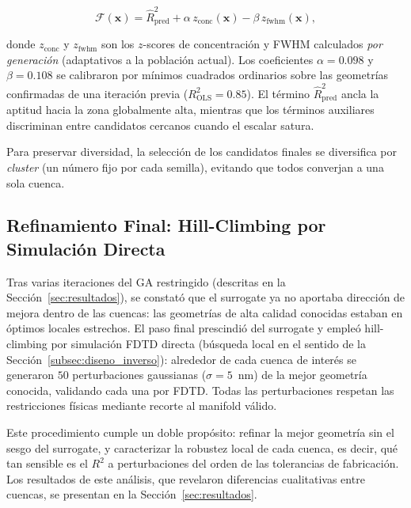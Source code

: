 \begin{equation}
    \mathcal{F}(\mathbf{x}) = \hat{R}^2_{\text{pred}}
    + \alpha\, z_{\text{conc}}(\mathbf{x}) - \beta\, z_{\text{fwhm}}(\mathbf{x}),
    \label{eq:combo_fitness}
\end{equation}

\noindent donde $z_{\text{conc}}$ y $z_{\text{fwhm}}$ son los $z$-scores de concentración y
FWHM calculados \emph{por generación} (adaptativos a la población actual). Los coeficientes
$\alpha = 0.098$ y $\beta = 0.108$ se calibraron por mínimos cuadrados ordinarios sobre las
geometrías confirmadas de una iteración previa ($R^2_{\text{OLS}} = 0.85$). El término
$\hat{R}^2_{\text{pred}}$ ancla la aptitud hacia la zona globalmente alta, mientras que los
términos auxiliares discriminan entre candidatos cercanos cuando el escalar satura.

Para preservar diversidad, la selección de los candidatos finales se diversifica por
\textit{cluster} (un número fijo por cada semilla), evitando que todos converjan a una
sola cuenca.

\subsection{Refinamiento Final: Hill-Climbing por Simulación Directa}\label{subsec:hill_climbing}

Tras varias iteraciones del GA restringido (descritas en la
Sección~\ref{sec:resultados}), se constató que el surrogate ya no aportaba dirección de mejora dentro de las cuencas: las geometrías de alta calidad conocidas estaban en óptimos locales estrechos. El paso final prescindió del surrogate y empleó hill-climbing por simulación FDTD directa (búsqueda local en el sentido de la Sección~\ref{subsec:diseno_inverso}): alrededor de cada cuenca de interés se generaron $50$ perturbaciones gaussianas ($\sigma = 5$~nm) de la mejor geometría conocida, validando cada una por FDTD. Todas las perturbaciones respetan las restricciones físicas mediante recorte al manifold válido.

Este procedimiento cumple un doble propósito: refinar la mejor geometría sin el sesgo del surrogate, y caracterizar la robustez local de cada cuenca, es decir, qué tan sensible es el $R^2$ a perturbaciones del orden de las tolerancias de fabricación. Los resultados de este análisis, que revelaron diferencias cualitativas entre cuencas, se presentan en la Sección~\ref{sec:resultados}.
